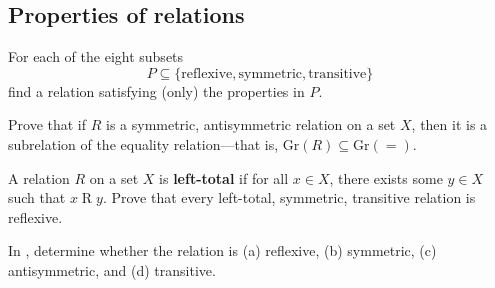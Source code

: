 \subsection*{Properties of relations}

\begin{chapex}
For each of the eight subsets
$$P \subseteq \{ \text{reflexive}, \text{symmetric}, \text{transitive} \}$$
find a relation satisfying (only) the properties in $P$.
\end{chapex}

\begin{chapex}
Prove that if $R$ is a symmetric, antisymmetric relation on a set $X$, then it is a subrelation of the equality relation---that is, $\mathrm{Gr}(R) \subseteq \mathrm{Gr}(=)$.
\end{chapex}

\begin{chapex}
A relation $R$ on a set $X$ is \textbf{left-total} if for all $x \in X$, there exists some $y \in X$ such that $x \mathbin{R} y$. Prove that every left-total, symmetric, transitive relation is reflexive.
\end{chapex}

In , determine whether the relation is (a) reflexive, (b) symmetric, (c) antisymmetric, and (d) transitive.

\begin{chapex}
\label{cqVerifyPropertiesOfRelationsBegin}

\end{chapex}

\begin{chapex}

\end{chapex}

\begin{chapex}

\end{chapex}

\begin{chapex}

\end{chapex}

\begin{chapex}

\end{chapex}

\begin{chapex}
\label{cqVerifyPropertiesOfRelationsEnd}

\end{chapex}

